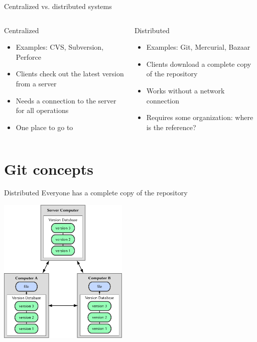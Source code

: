 \documentclass{beamer}
\begin{document}
\begin{frame}{Centralized vs. distributed systems}
  \begin{columns}[t]
    \begin{column}{5.5cm}
      \begin{block}{Centralized}
        \begin{itemize}
        \item Examples: CVS, Subversion, Perforce
        \item Clients check out the latest version from a server
        \item Needs a connection to the server for all operations
        \item One place to go to
        \end{itemize}
      \end{block}
    \end{column}
    \begin{column}{5.5cm}
      \begin{block}{Distributed}
        \begin{itemize}
        \item Examples: Git, Mercurial, Bazaar
        \item Clients download a complete copy of the repository
        \item Works without a network connection
        \item Requires some organization: where is the reference?
        \end{itemize}
      \end{block}
    \end{column}
  \end{columns}
\end{frame}

\section{Git concepts}

\begin{frame}{Distributed}
  Everyone has a complete copy of the repository
  \begin{center}
    \includegraphics[height=7cm]{images/fig0103.pdf}
  \end{center}
\end{frame}
\end{document}
